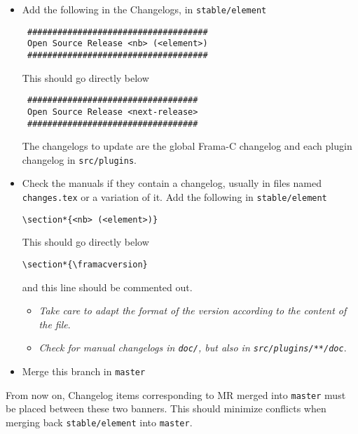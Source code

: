 \begin{itemize}
\item Add the following in the Changelogs, in \texttt{stable/element}
\begin{verbatim}
 ####################################
 Open Source Release <nb> (<element>)
 ####################################
\end{verbatim}

This should go directly below
\begin{verbatim}
 ##################################
 Open Source Release <next-release>
 ##################################
\end{verbatim}

The changelogs to update are the global Frama-C changelog and each plugin
changelog in \texttt{src/plugins}.

\item Check the manuals if they contain a changelog, usually in files named
\texttt{changes.tex} or a variation of it. Add the following in
\texttt{stable/element}
\begin{verbatim}
\section*{<nb> (<element>)}
\end{verbatim}

This should go directly below
\begin{verbatim}
\section*{\framacversion}
\end{verbatim}

and this line should be commented out.

\begin{itemize}
  \item \emph{Take care to adapt the format of the version according to the
        content of the file}.
  \item \emph{Check for manual changelogs in \texttt{doc/}, but also in
        \texttt{src/plugins/**/doc}}.
\end{itemize}

\item Merge this branch in \texttt{master}
\end{itemize}

From now on, Changelog items corresponding to MR merged into \texttt{master}
must be placed between these two banners. This should minimize conflicts when
merging back \texttt{stable/element} into \texttt{master}.

